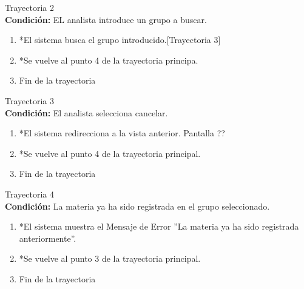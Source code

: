 		\large{Trayectoria 2}\\
		\textbf{Condición:} EL analista introduce un grupo a buscar.
		\begin{enumerate}
			\item *El sistema busca el grupo introducido.[Trayectoria 3]
			\item *Se vuelve al punto 4 de la trayectoria principa.
			\item Fin de la trayectoria
		\end{enumerate}
		\large{Trayectoria 3}\\
		\textbf{Condición:} El analista selecciona cancelar.
		\begin{enumerate}
			\item *El sistema redirecciona a la vista anterior. Pantalla ??
			\item *Se vuelve al punto 4 de la trayectoria principal.
			\item Fin de la trayectoria
		\end{enumerate}
		\large{Trayectoria 4}\\
		\textbf{Condición:} La materia ya ha sido registrada en el grupo seleccionado.
		\begin{enumerate}
			\item *El sistema muestra el Mensaje de Error ''La materia ya ha sido registrada anteriormente''.
			\item *Se vuelve al punto 3 de la trayectoria principal.
			\item Fin de la trayectoria
		\end{enumerate}\newpage
